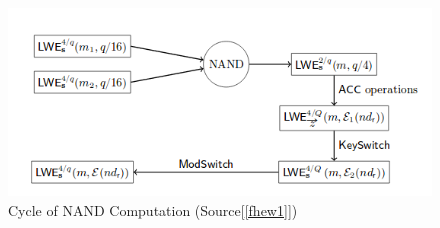 \begin{figure}[!h]
\centering
\includegraphics[scale=0.7]{figures/NAND.png}
\caption{Cycle of NAND Computation (Source[\ref{fhew1}])}
\label{fig:NAND cycle}
\end{figure}